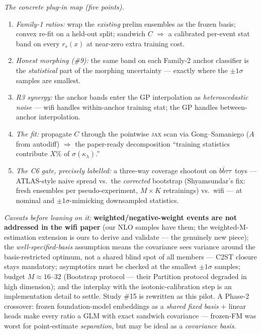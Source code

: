 \documentclass[11pt]{article}
\newcommand{\kl}{\ensuremath{\kappa_\lambda}}
\newcommand{\bbtt}{\ensuremath{b\bar b\tau\tau}}
\begin{document}
\smallskip\noindent\emph{The concrete plug-in map (five points).}
\begin{enumerate}[leftmargin=1.4em]
\item \emph{Family-1 ratios:} wrap the \emph{existing} prelim ensembles as the frozen basis; convex re-fit on a
  held-out split; sandwich $C$ $\Rightarrow$ a calibrated per-event stat band on every $r_s(x)$ at near-zero
  extra training cost.
\item \emph{Honest morphing (\#9):} the same band on each Family-2 anchor classifier is the \emph{statistical}
  part of the morphing uncertainty --- exactly where the $\pm1\sigma$ samples are smallest.
\item \emph{R3 synergy:} the anchor bands enter the GP interpolation as \emph{heteroscedastic noise} --- wifi
  handles within-anchor training stat; the GP handles between-anchor interpolation.
\item \emph{The fit:} propagate $C$ through the pointwise \textsc{jax} scan via Gong--Samaniego ($A$ from
  autodiff) $\Rightarrow$ the paper-ready decomposition ``training statistics contribute $X\%$ of
  $\sigma(\kl)$.''
\item \emph{The C6 gate, precisely labelled:} a three-way coverage shootout on \bbtt\ toys --- ATLAS-style naive
  spread vs.\ the \emph{corrected} bootstrap (Shyamsundar's fix: fresh ensembles per pseudo-experiment,
  $M\times K$ retrainings) vs.\ wifi --- at nominal and $\pm1\sigma$-mimicking downsampled statistics.
\end{enumerate}
\noindent\emph{Caveats before leaning on it:} \textbf{weighted/negative-weight events are not addressed in the
wifi paper} (our NLO samples have them; the weighted-M-estimation extension is ours to derive and validate ---
the genuinely new piece); the \emph{well-specified-basis} assumption means the covariance sees variance around
the basis-restricted optimum, not a shared blind spot of all members --- C2ST closure stays mandatory;
asymptotics must be checked at the smallest $\pm1\sigma$ samples; budget $M\approx16$--$32$ (Bootstrap protocol
--- their Partition protocol degraded in high dimension); and the interplay with the isotonic-calibration step is
an implementation detail to settle. Study \#15 is rewritten as this pilot. A Phase-2 crossover: frozen
foundation-model embeddings as a \emph{shared fixed basis} $+$ linear heads make every ratio a GLM with exact
sandwich covariance --- frozen-FM was worst for point-estimate \emph{separation}, but may be ideal as a
\emph{covariance basis}.
\end{document}
